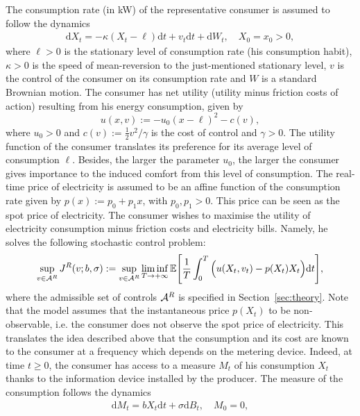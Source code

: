 \documentclass[a4paper,10pt]{article}
\newcommand{\EE}{\mathbb{E}}
\newcommand{\D}{\mathrm{d}}
\theoremstyle{definition}
\theoremstyle{plain}
\numberwithin{equation}{section}
\begin{document}
The consumption rate (in kW) of the representative consumer is assumed to follow the dynamics
\begin{align}
	\D X_t = -\kappa(X_t - \ell) \D t  + v_t \D t + \D W_t, \quad X_0=x_0>0,
\end{align}
where $\ell>0$ is the stationary level of consumption rate (his consumption habit), $\kappa > 0$ is the speed of mean-reversion to the just-mentioned stationary level, $v$ is the control of the consumer on its consumption rate and $W$ is a standard Brownian motion. The consumer has net utility (utility minus friction costs of action) resulting from his energy consumption, given by 
\begin{equation}\label{eq:utility_elec}
u(x,v) := -u_0 (x- \ell)^2 - c(v),
\end{equation}
where $u_0 >0$ and $c(v) := \frac12 v^2/\gamma$ is the cost of control and $\gamma>0$. The utility function of the consumer translates its preference for its average level of consumption $\ell$. Besides, the larger the parameter $u_0$, the larger the consumer gives importance to the induced comfort from this level of consumption. The real-time price of electricity is assumed to be an affine function of the consumption rate given by $p(x) := p_0 + p_1 x$, with $p_0, p_1>0$.  This price can be seen as the spot price of electricity. The consumer wishes to maximise the utility of electricity consumption minus friction costs and electricity bills. Namely, he solves the following stochastic control problem:
\begin{align}
	\sup_{v \in \mathcal A^{\rm R}} J^{\rm {R}}(v; b ,\sigma) := \sup_{v \in \mathcal A^{\rm R}}   \liminf_{T\to +\infty} \EE\Bigg[ \frac1T \int_0^T \Big( u(X_t,v_t) - p(X_t) X_t \Big) \D t \Bigg],
\end{align}
where the admissible set of controls $\mathcal A^{\rm R}$ is specified in Section~\ref{sec:theory}. Note that the model assumes that the instantaneous price $p(X_t)$ to be non-observable, i.e. the consumer does not observe the spot price of electricity. This translates the idea described above that the consumption and its cost are known to the consumer at a frequency which depends on the metering device. Indeed, at time $t\geq 0$, the consumer has access to a measure $M_t$ of his consumption $X_t$ thanks to the information device installed by the producer. The measure of the consumption follows the dynamics 
\begin{align}
	\D M_t = bX_t \D t  + \sigma \D B_t, \quad M_0 =0,
\end{align}
\end{document}
